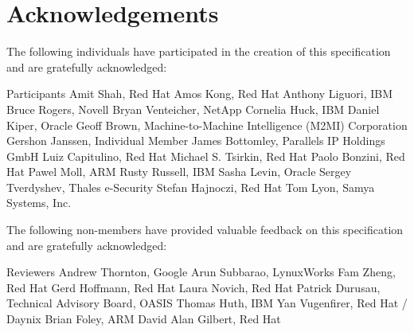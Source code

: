\chapter{Acknowledgements}\label{chap:Acknowledgements}

The following individuals have participated in the creation of this specification and are gratefully acknowledged:

\begin{oasistitlesection}{Participants}
Amit Shah,	Red Hat	\newline
Amos Kong,	Red Hat	\newline
Anthony Liguori,	IBM	\newline
Bruce Rogers,	Novell	\newline
Bryan Venteicher,	NetApp	\newline
Cornelia Huck,	IBM	\newline
Daniel Kiper,	Oracle	\newline
Geoff Brown,	Machine-to-Machine Intelligence (M2MI) Corporation	\newline
Gershon Janssen,	Individual Member	\newline
James Bottomley,	Parallels IP Holdings GmbH	\newline
Luiz Capitulino,	Red Hat	\newline
Michael S. Tsirkin,	Red Hat	\newline
Paolo Bonzini,	Red Hat	\newline
Pawel Moll,	ARM \newline
Rusty Russell,	IBM	\newline
Sasha Levin,	Oracle	\newline
Sergey Tverdyshev,	Thales e-Security	\newline
Stefan Hajnoczi,	Red Hat	\newline
Tom Lyon,	Samya Systems, Inc.	\newline
\end{oasistitlesection}

The following non-members have provided valuable feedback on this
specification and are gratefully acknowledged:

\begin{oasistitlesection}{Reviewers}
Andrew Thornton,  Google \newline
Arun Subbarao,	LynuxWorks	\newline
Fam Zheng, Red Hat	\newline
Gerd Hoffmann, Red Hat	\newline
Laura Novich, Red Hat	\newline
Patrick Durusau,	Technical Advisory Board, OASIS	\newline
Thomas Huth,	IBM	\newline
Yan Vugenfirer, Red Hat / Daynix	\newline
Brian Foley,  ARM \newline
David Alan Gilbert, Red Hat \newline
\end{oasistitlesection}

